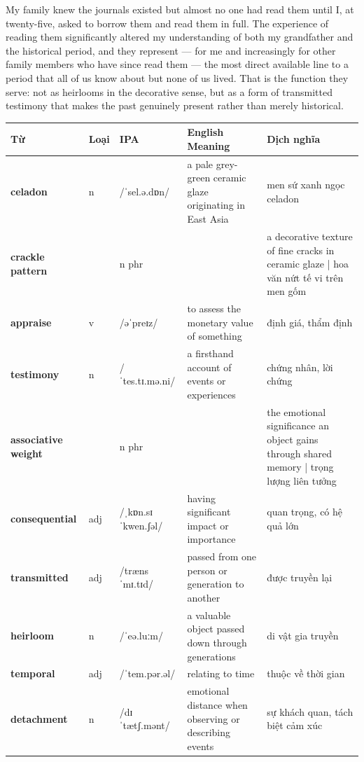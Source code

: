 \begin{ieltsanswer}
My family knew the journals existed but almost no one had read them until I, at twenty-five, asked to borrow them and read them in full. The experience of reading them significantly altered my understanding of both my grandfather and the historical period, and they represent — for me and increasingly for other family members who have since read them — the most direct available line to a period that all of us know about but none of us lived. That is the function they serve: not as heirlooms in the decorative sense, but as a form of transmitted testimony that makes the past genuinely present rather than merely historical.
\end{ieltsanswer}


\vspace{0.8em}
\begin{center}
\renewcommand{\arraystretch}{1.65}
\begin{tabularx}{\textwidth}{|V{0.22\textwidth}|C{0.07\textwidth}|I{0.20\textwidth}|Y|V{0.18\textwidth}|}
\hline
{}
\textbf{Từ} & \textbf{Loại} & \textbf{IPA} & \textbf{English Meaning} & \textbf{Dịch nghĩa} \\
\hline
\textbf{celadon} & n & /ˈsel.ə.dɒn/ & a pale grey-green ceramic glaze originating in East Asia & men sứ xanh ngọc celadon \\ \hline
\textbf{crackle pattern} & & n phr & & a decorative texture of fine cracks in ceramic glaze | hoa văn nứt tế vi trên men gốm \\ \hline
\textbf{appraise} & v & /əˈpreɪz/ & to assess the monetary value of something & định giá, thẩm định \\ \hline
\textbf{testimony} & n & /ˈtes.tɪ.mə.ni/ & a firsthand account of events or experiences & chứng nhân, lời chứng \\ \hline
\textbf{associative weight} & & n phr & & the emotional significance an object gains through shared memory | trọng lượng liên tưởng \\ \hline
\textbf{consequential} & adj & /ˌkɒn.sɪˈkwen.ʃəl/ & having significant impact or importance & quan trọng, có hệ quả lớn \\ \hline
\textbf{transmitted} & adj & /trænsˈmɪ.tɪd/ & passed from one person or generation to another & được truyền lại \\ \hline
\textbf{heirloom} & n & /ˈeə.luːm/ & a valuable object passed down through generations & di vật gia truyền \\ \hline
\textbf{temporal} & adj & /ˈtem.pər.əl/ & relating to time & thuộc về thời gian \\ \hline
\textbf{detachment} & n & /dɪˈtætʃ.mənt/ & emotional distance when observing or describing events & sự khách quan, tách biệt cảm xúc \\ \hline
\end{tabularx}
\end{center}

